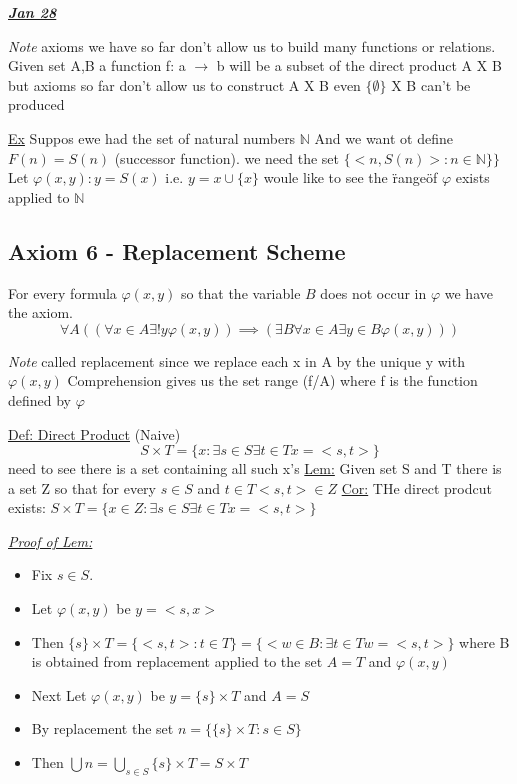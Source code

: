 \documentclass{article}
\begin{document}
    \underline{\textbf{\emph{Jan 28}}}

    \emph{Note} axioms we have so far don't allow us to build many functions or relations.
    Given set A,B a function f: a $\rightarrow$ b will be a subset of the direct product A X B but axioms so far don't allow us to construct A X B
    even $\{\emptyset\}$ X B can't be produced

    \underline{Ex} Suppos ewe had the set of natural numbers $\mathbb{N}$
    And we want ot define $F(n) = S(n)$ (successor function).
    we need the set $\{<n,S(n)> : n \in \mathbb{N}\}\}$
    Let $\varphi(x,y) : y=S(x)$ i.e. $y = x \cup \{x\}$
    woule like to see the \"range\" of $\varphi$ exists applied to $\mathbb{N}$

    \subsection{Axiom 6 - Replacement Scheme}
    For every formula $\varphi(x,y)$ so that the variable $B$ does not occur in $\varphi$ we have the axiom.
    \[ \forall A ((\forall x \in A \exists! y \varphi(x,y)) \implies (\exists B \forall x \in A \exists y \in B \varphi(x,y)))\]

    \emph{Note} called replacement since we replace each x in A by the unique y with $\varphi(x,y)$
    Comprehension gives us the set range (f/A) where f is the function defined by $\varphi$

    \underline{Def: Direct Product} (Naive)
    \[S \times T = \{x : \exists s \in S \exists t \in T x=<s,t>\}\]
    need to see there is a set containing all such x's
    \underline{Lem:} Given set S and T there is a set Z so that for every $s \in S$ and $t \in T <s,t> \in Z$
    \underline{Cor:} THe direct prodcut exists: $S \times T = \{x \in Z : \exists s \in S \exists t \in T x=<s,t>\}$

    \underline{\emph{Proof of Lem:}}
    \begin{itemize}
        \item Fix $s \in S$.
        \item Let $\varphi(x,y)$ be $y=<s,x>$
        \item Then $\{s\} \times T = \{<s,t> : t \in T\} = \{<w \in B : \exists t \in T w = <s,t>\}$ where B is obtained from replacement applied to the set $A = T$ and $\varphi(x,y)$
        \item Next Let $\varphi(x,y)$ be $y = \{s\} \times T$ and $A=S$
        \item By replacement the set $n = \{\{s\} \times T : s \in S\}$
        \item Then $\bigcup n = \bigcup_{s \in S}\{s\} \times T = S \times T$
    \end{itemize}
\end{document}
